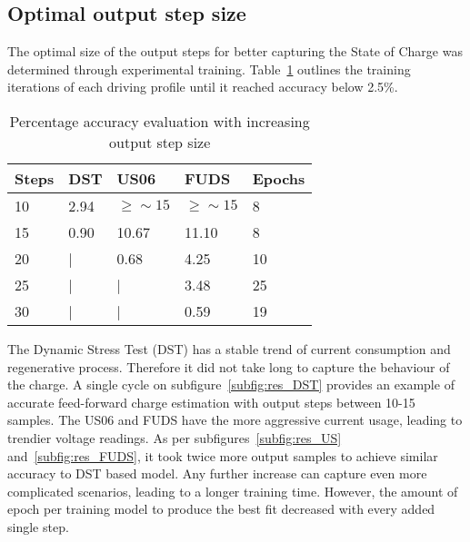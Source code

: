 \subsection{Optimal output step size}
    The optimal size of the output steps for better capturing the State of Charge was determined through experimental training. Table~\ref{tab:out_steps} outlines the training iterations of each driving profile until it reached accuracy below 2.5\%.
    \begin{table}[htbp]
        \centering
        \caption{Percentage accuracy evaluation with increasing output step size}
        \label{tab:out_steps}
        \begin{tabular}{ p{1.5cm} || p{1.5cm} p{1.5cm} p{1.5cm} || p{1.5cm}  }
            \hline
            Steps & DST & US06 & FUDS & Epochs \\
            \hline
            10 & 2.94 & $\geq\sim 15$ & $\geq\sim 15$ & 8 \\
            15 & 0.90 & 10.67  & 11.10  & 8 \\
            20 & |    & 0.68   &  4.25  & 10 \\
            25 & |    & |      &  3.48  & 25 \\
            30 & |    & |      &  0.59  & 19 \\
            \hline
        \end{tabular}
    \end{table}
    
    The Dynamic Stress Test (DST) has a stable trend of current consumption and regenerative process.
    Therefore it did not take long to capture the behaviour of the charge.
    A single cycle on subfigure~\ref{subfig:res_DST} provides an example of accurate feed-forward charge estimation with output steps between 10-15 samples.
    The US06 and FUDS have the more aggressive current usage, leading to trendier voltage readings.
    As per subfigures~\ref{subfig:res_US} and~\ref{subfig:res_FUDS}, it took twice more output samples to achieve similar accuracy to DST based model.
    Any further increase can capture even more complicated scenarios, leading to a longer training time.
    However, the amount of epoch per training model to produce the best fit decreased with every added single step.
    
